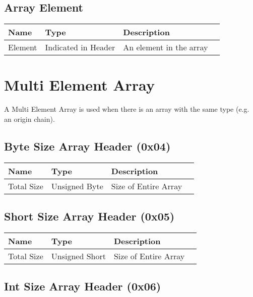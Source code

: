 \documentclass[11pt]{article}
\begin{document}
\subsection{Array Element}

\begin{center}
\begin{tabular}{ |l|l|l|l| } 
\hline
\textbf{Name} & \textbf{Type} & \textbf{Description}\\
\hline
Element & Indicated in Header & An element in the array\\
\hline
\end{tabular}
\end{center}

\section{Multi Element Array}
A Multi Element Array is used when there is an array with the same type (e.g. an origin chain).
\subsection{Byte Size Array Header (0x04)}

\begin{center}
\begin{tabular}{ |l|l|l|l| } 
\hline
\textbf{Name} & \textbf{Type} & \textbf{Description}\\
\hline
Total Size & Unsigned Byte & Size of Entire Array\\  
\hline
\end{tabular}
\end{center}

\subsection{Short Size Array Header (0x05)}

\begin{center}
\begin{tabular}{ |l|l|l|l| } 
\hline
\textbf{Name} & \textbf{Type} & \textbf{Description}\\
\hline
Total Size & Unsigned Short & Size of Entire Array\\  
\hline
\end{tabular}
\end{center}

\subsection{Int Size Array Header (0x06)}
\end{document}
